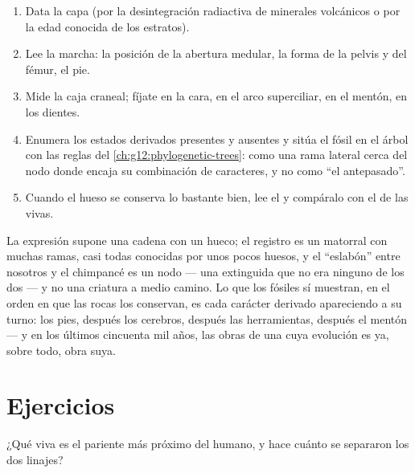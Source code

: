 \begin{method}\label{met:g12:human-evolution:placing}
\begin{enumerate}
  \item Data la capa (por la desintegración radiactiva de minerales
        volcánicos o por la edad conocida de los estratos).
  \item Lee la marcha: la posición de la abertura medular, la forma de
        la pelvis y del fémur, el pie.
  \item Mide la caja craneal; fíjate en la cara, en el arco
        superciliar, en el mentón, en los dientes.
  \item Enumera los estados derivados presentes y ausentes y sitúa el
        fósil en el árbol con las reglas del
        \cref{ch:g12:phylogenetic-trees}: como una rama lateral cerca
        del nodo donde encaja su combinación de caracteres, y no como
        ``el antepasado''.
  \item Cuando el hueso se conserva lo bastante bien, lee el  y
        compáralo con el de las  vivas.
\end{enumerate}
\end{method}

\begin{remark}\label{rem:g12:human-evolution:link}
La expresión supone una cadena con un hueco; el registro es un matorral
con muchas ramas, casi todas conocidas por unos pocos huesos, y el
``eslabón'' entre nosotros y el chimpancé es un nodo --- una 
extinguida que no era ninguno de los dos --- y no una criatura a medio
camino. Lo que los fósiles sí muestran, en el orden en que las rocas
los conservan, es cada carácter derivado apareciendo a su turno: los
pies, después los cerebros, después las herramientas, después el mentón
--- y en los últimos cincuenta mil años, las obras de una  cuya
evolución es ya, sobre todo, obra suya.
\end{remark}

\section{Ejercicios}

\begin{exercise}[$\star$]\label{exo:g12:human-evolution:1}
¿Qué  viva es el pariente más próximo del humano, y hace cuánto
se separaron los dos linajes?
\end{exercise}

